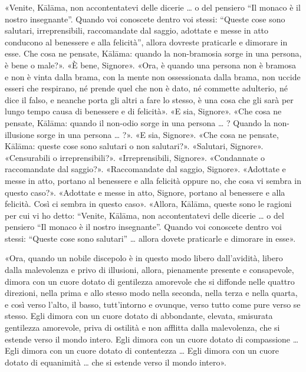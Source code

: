 «Venite, Kālāma, non accontentatevi delle dicerie … o del pensiero “Il
monaco è il nostro insegnante”. Quando voi conoscete dentro voi stessi:
“Queste cose sono salutari, irreprensibili, raccomandate dal saggio,
adottate e messe in atto conducono al benessere e alla felicità”, allora
dovreste praticarle e dimorare in esse. Che cosa ne pensate, Kālāma:
quando la non-bramosia sorge in una persona, è bene o male?». «È bene,
Signore». «Ora, è quando una persona non è bramosa e non è vinta dalla
brama, con la mente non ossessionata dalla brama, non uccide esseri che
respirano, né prende quel che non è dato, né commette adulterio, né dice
il falso, e neanche porta gli altri a fare lo stesso, è una cosa che gli
sarà per lungo tempo causa di benessere e di felicità». «E sia,
Signore». «Che cosa ne pensate, Kālāma: quando il non-odio sorge in una
persona … ? Quando la non-illusione sorge in una persona … ?». «E sia,
Signore». «Che cosa ne pensate, Kālāma: queste cose sono salutari o non
salutari?». «Salutari, Signore». «Censurabili o irreprensibili?».
«Irreprensibili, Signore». «Condannate o raccomandate dal saggio?».
«Raccomandate dal saggio, Signore». «Adottate e messe in atto, portano
al benessere e alla felicità oppure no, che cosa vi sembra in questo
caso?». «Adottate e messe in atto, Signore, portano al benessere e alla
felicità. Così ci sembra in questo caso». «Allora, Kālāma, queste sono
le ragioni per cui vi ho detto: “Venite, Kālāma, non accontentatevi
delle dicerie … o del pensiero “Il monaco è il nostro insegnante”.
Quando voi conoscete dentro voi stessi: “Queste cose sono salutari” …
allora dovete praticarle e dimorare in esse».


«Ora, quando un nobile discepolo è in questo modo libero dall’avidità,
libero dalla malevolenza e privo di illusioni, allora, pienamente
presente e consapevole, dimora con un cuore dotato di gentilezza
amorevole che si diffonde nelle quattro direzioni, nella prima e allo
stesso modo nella seconda, nella terza e nella quarta, e così verso
l’alto, il basso, tutt’intorno e ovunque, verso tutto come pure verso se
stesso. Egli dimora con un cuore dotato di abbondante, elevata,
smisurata gentilezza amorevole, priva di ostilità e non afflitta dalla
malevolenza, che si estende verso il mondo intero. Egli dimora con un
cuore dotato di compassione … Egli dimora con un cuore dotato di
contentezza … Egli dimora con un cuore dotato di equanimità … che si
estende verso il mondo intero».


